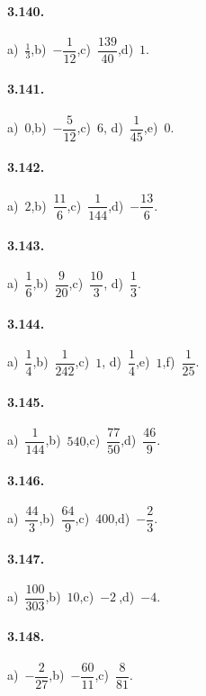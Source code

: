 \begin{multicols}{2}
\paragraph{3.140.}
a)~$\frac{1}{3}$,\quad b)~$-\dfrac{1}{12}$,\quad c)~$\dfrac{139}{40}$,\quad d)~$1$.

\paragraph{3.141.}
a)~$0$,\quad b)~$-\dfrac{5}{12}$,\quad c)~$6$,\quad %
d)~$\dfrac{1}{45}$,\quad e)~$0$.

\paragraph{3.142.}
a)~$2$,\quad b)~$\dfrac{11}{6}$,\quad c)~$\dfrac{1}{144}$,\quad d)~$-\dfrac{13}{6}$.

\paragraph{3.143.}
a)~$\dfrac{1}{6}$,\quad b)~$\dfrac{9}{20}$,\quad c)~$\dfrac{10}{3}$,\quad %
d)~$\dfrac{1}{3}$.

\paragraph{3.144.}
a)~$\dfrac{1}{4}$,\quad b)~$\dfrac{1}{242}$,\quad c)~$1$,\quad %
d)~$\dfrac{1}{4}$,\quad e)~$1$,\quad f)~$\dfrac{1}{25}$.

\paragraph{3.145.}
a)~$\dfrac{1}{144}$,\quad b)~$540$,\quad c)~$\dfrac{77}{50}$,\quad d)~$\dfrac{46}{9}$.

\paragraph{3.146.}
a)~$\dfrac{44}{3}$,\quad b)~$\dfrac{64}{9}$,\quad c)~$400$,\quad d)~$-\dfrac{2}{3}$.

\paragraph{3.147.}
a)~$\dfrac{100}{303}$,\quad b)~$10$,\quad c)~$-2~$,\quad d)~$-4$.

\paragraph{3.148.}
a)~$-\dfrac{2}{27}$,\quad b)~$-\dfrac{60}{11}$,\quad c)~$\dfrac{8}{81}$.%


\end{multicols}
